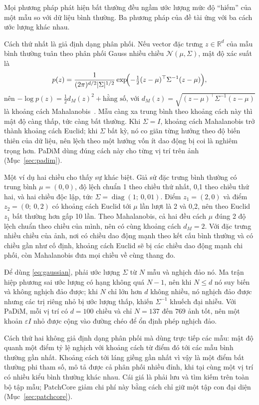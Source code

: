 Mọi phương pháp phát hiện bất thường đều ngầm ước lượng mức độ ``hiếm'' của một mẫu so với dữ liệu bình thường. Ba
phương pháp của đề tài ứng với ba cách ước lượng khác nhau.

Cách thứ nhất là giả định dạng phân phối. Nếu vector đặc trưng $z \in \mathbb{R}^d$ của mẫu bình thường tuân theo
phân phối Gauss nhiều chiều $\mathcal{N}(\mu, \Sigma)$, mật độ xác suất là
\begin{equation}
  p(z) = \frac{1}{(2\pi)^{d/2} \lvert\Sigma\rvert^{1/2}}
  \exp\!\Bigl(-\tfrac{1}{2} (z-\mu)^{\top} \Sigma^{-1} (z-\mu)\Bigr) ,
  \label{eq:gaussian}
\end{equation}
nên $-\log p(z) = \tfrac{1}{2} d_M(z)^2 + \text{hằng số}$, với $d_M(z) = \sqrt{(z-\mu)^{\top}\Sigma^{-1}(z-\mu)}$ là
khoảng cách Mahalanobis~\cite{mahalanobisGeneralizedDistanceStatistics1936}. Mẫu càng xa trung bình theo khoảng cách
này thì mật độ càng thấp, tức càng bất thường. Khi $\Sigma = I$, khoảng cách Mahalanobis trở thành khoảng cách Euclid;
khi $\Sigma$ bất kỳ, nó co giãn từng hướng theo độ biến thiên của dữ liệu, nên lệch theo một hướng vốn ít dao động bị
coi là nghiêm trọng hơn. PaDiM dùng đúng cách này cho từng vị trí trên ảnh (Mục~\ref{sec:padim}).

Một ví dụ hai chiều cho thấy sự khác biệt. Giả sử đặc trưng bình thường có trung bình $\mu = (0, 0)$, độ lệch chuẩn 1
theo chiều thứ nhất, 0,1 theo chiều thứ hai, và hai chiều độc lập, tức $\Sigma = \operatorname{diag}(1;\ 0{,}01)$.
Điểm $z_1 = (2, 0)$ và điểm $z_2 = (0;\ 0{,}2)$ có khoảng cách Euclid tới $\mu$ lần lượt là 2 và 0,2, nên theo Euclid
$z_1$ bất thường hơn gấp 10 lần. Theo Mahalanobis, cả hai đều cách $\mu$ đúng 2 độ lệch chuẩn theo chiều của mình,
nên có cùng khoảng cách $d_M = 2$. Với đặc trưng nhiều chiều của ảnh, nơi có chiều dao động mạnh theo kết cấu bình
thường và có chiều gần như cố định, khoảng cách Euclid sẽ bị các chiều dao động mạnh chi phối, còn Mahalanobis đưa mọi
chiều về cùng thang đo.

Để dùng \eqref{eq:gaussian}, phải ước lượng $\Sigma$ từ $N$ mẫu và nghịch đảo nó. Ma trận hiệp phương sai ước lượng
có hạng không quá $N - 1$, nên khi $N \le d$ nó suy biến và không nghịch đảo được; khi $N$ chỉ lớn hơn $d$ không nhiều,
nó nghịch đảo được nhưng các trị riêng nhỏ bị ước lượng thấp, khiến $\Sigma^{-1}$ khuếch đại nhiễu. Với PaDiM, mỗi vị
trí có $d = 100$ chiều và chỉ $N = 137$ đến $769$ ảnh tốt, nên một khoản $\varepsilon I$ nhỏ được cộng vào đường chéo
để ổn định phép nghịch đảo.

Cách thứ hai không giả định dạng phân phối mà dùng trực tiếp các mẫu: mật độ quanh một điểm tỷ lệ nghịch với khoảng
cách từ điểm đó tới các mẫu bình thường gần nhất. Khoảng cách tới láng giềng gần nhất vì vậy là một điểm bất thường
phi tham số, mô tả được cả phân phối nhiều đỉnh, khi tại cùng một vị trí có nhiều kiểu bình thường khác nhau. Cái giá
là phải lưu và tìm kiếm trên toàn bộ tập mẫu; PatchCore giảm chi phí này bằng cách chỉ giữ một tập con đại diện
(Mục~\ref{sec:patchcore}).

